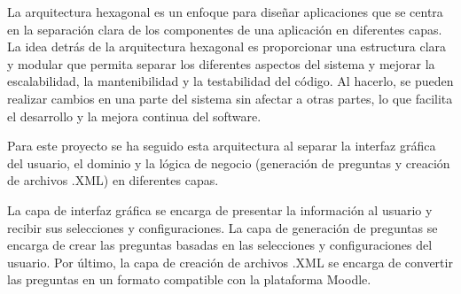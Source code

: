 La arquitectura hexagonal es un enfoque para diseñar aplicaciones que se centra en la separación clara de los componentes de una aplicación en diferentes capas. La idea detrás de la arquitectura hexagonal es proporcionar una estructura clara y modular que permita separar los diferentes aspectos del sistema y mejorar la escalabilidad, la mantenibilidad y la testabilidad del código. Al hacerlo, se pueden realizar cambios en una parte del sistema sin afectar a otras partes, lo que facilita el desarrollo y la mejora continua del software. \cite{wiki:hexagonal}

Para este proyecto se ha seguido esta arquitectura al separar la interfaz gráfica del usuario, el dominio y la lógica de negocio (generación de preguntas y creación de archivos .XML) en diferentes capas.

La capa de interfaz gráfica se encarga de presentar la información al usuario y recibir sus selecciones y configuraciones. La capa de generación de preguntas se encarga de crear las preguntas basadas en las selecciones y configuraciones del usuario. Por último, la capa de creación de archivos .XML se encarga de convertir las preguntas en un formato compatible con la plataforma Moodle.



